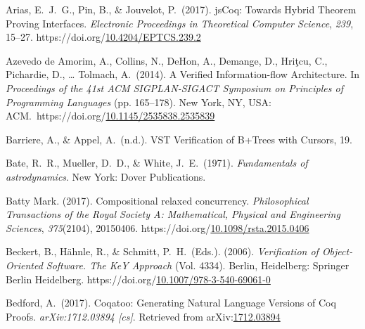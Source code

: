 \documentclass[12pt,twoside]{article}
\begin{document}
{\begin{thebibliography}{222}
\mdbibitemlabel{}Arias, E.~J.~G., Pin, B., \& Jouvelot, P.~(2017). jsCoq: Towards Hybrid Theorem Proving Interfaces. \emph{Electronic Proceedings in Theoretical Computer Science}, \emph{239}, 15–27. https://doi.org/\href{https://dx.doi.org/10.4204/EPTCS.239.2}{10.4204/EPTCS.239.2}\label{arias_jscoq:_2017}%

\mdbibitemlabel{}Azevedo de Amorim, A., Collins, N., DeHon, A., Demange, D., Hriţcu, C., Pichardie, D., … Tolmach, A.~(2014). A Verified Information-flow Architecture. In \emph{Proceedings of the 41st ACM SIGPLAN-SIGACT Symposium on Principles of Programming Languages} (pp. 165–178). New York, NY, USA: ACM.~https://doi.org/\href{https://dx.doi.org/10.1145/2535838.2535839}{10.1145/2535838.2535839}\label{azevedo_de_amorim_verified_2014}%

\mdbibitemlabel{}Barriere, A., \& Appel, A.~(n.d.). VST Veriﬁcation of B+Trees with Cursors, 19.\label{barriere_vst_nodate}%

\mdbibitemlabel{}Bate, R.~R., Mueller, D.~D., \& White, J.~E.~(1971). \emph{Fundamentals of astrodynamics}. New York: Dover Publications.\label{bate_fundamentals_1971}%

\mdbibitemlabel{}Batty Mark. (2017). Compositional relaxed concurrency. \emph{Philosophical Transactions of the Royal Society A: Mathematical, Physical and Engineering Sciences}, \emph{375}(2104), 20150406. https://doi.org/\href{https://dx.doi.org/10.1098/rsta.2015.0406}{10.1098/rsta.2015.0406}\label{batty_mark_compositional_2017}%

\mdbibitemlabel{}Beckert, B., Hähnle, R., \& Schmitt, P.~H.~(Eds.). (2006). \emph{Verification of Object-Oriented Software. The KeY Approach} (Vol. 4334). Berlin, Heidelberg: Springer Berlin Heidelberg. https://doi.org/\href{https://dx.doi.org/10.1007/978-3-540-69061-0}{10.1007/978-3-540-69061-0}\label{beckert_verification_2006}%

\mdbibitemlabel{}Bedford, A.~(2017). Coqatoo: Generating Natural Language Versions of Coq Proofs. \emph{arXiv:1712.03894 {}[cs]}. Retrieved from arXiv:\href{http://arxiv.org/abs/1712.03894}{1712.03894}\label{bedford_coqatoo:_2017}%


\end{thebibliography}}
\end{document}
